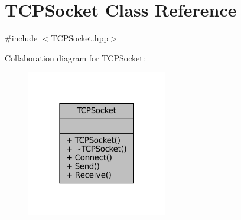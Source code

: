 \hypertarget{class_t_c_p_socket}{}\section{T\+C\+P\+Socket Class Reference}
\label{class_t_c_p_socket}


{\ttfamily \#include $<$T\+C\+P\+Socket.\+hpp$>$}



Collaboration diagram for T\+C\+P\+Socket\+:
\nopagebreak
\begin{figure}[H]
\begin{center}
\leavevmode
\includegraphics[width=174pt]{class_t_c_p_socket__coll__graph}
\end{center}
\end{figure}

